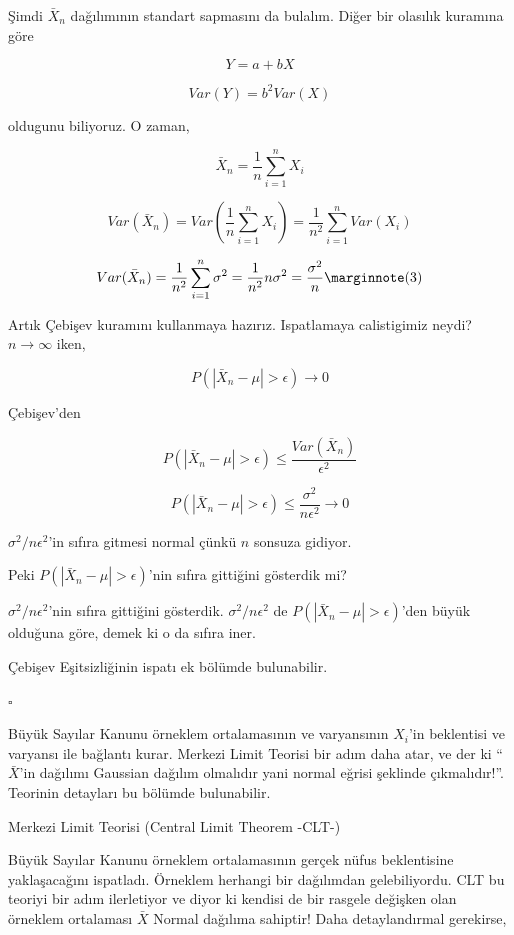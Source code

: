 \documentclass[12pt,fleqn]{article}\usepackage{../../common}
\begin{document}
Şimdi $\bar{X}_n$ dağılımının standart sapmasını da bulalım. Diğer bir
olasılık kuramına göre

$$ Y = a + bX $$

$$ Var(Y) = b^2Var(X) $$

oldugunu biliyoruz. O zaman,

$$ \bar{X}_n = \frac{1}{n} \sum_{i=1}^n X_i  $$

$$ Var(\bar{X}_n) = Var(\frac{1}{n}\sum_{i=1}^nX_i) = 
\frac{1}{n^2}\sum_{i=1}^n Var(X_i)
$$

$$ 
Var(\bar{X}_n) = \frac{1}{n^2}\sum_{i=1}^n \sigma^2 = 
\frac{1}{n^2}n\sigma^2 = \frac{\sigma^2}{n} 
\mlabel{3}
$$

Artık Çebişev kuramını kullanmaya hazırız. Ispatlamaya calistigimiz neydi?
$n \rightarrow \infty$ iken,

 $$ P(|\bar{X}_n-\mu| > \epsilon) \rightarrow 0 $$

Çebişev'den

$$ P(|\bar{X}_n-\mu| > \epsilon) \le \frac{Var(\bar{X}_n)}{\epsilon^2} $$

$$ P(|\bar{X}_n-\mu| > \epsilon) \le \frac{\sigma^2}{n\epsilon^2}
\rightarrow 0 $$

$\sigma^2 / n\epsilon^2$'in sıfıra gitmesi normal çünkü $n$ sonsuza gidiyor.

Peki $P(|\bar{X}_n-\mu| > \epsilon)$'nin sıfıra gittiğini gösterdik mi? 

$\sigma^2 / n\epsilon^2$'nin sıfıra gittiğini gösterdik. $\sigma^2 /
n\epsilon^2$ de $P(|\bar{X}_n-\mu| > \epsilon)$'den büyük olduğuna göre, demek
ki o da sıfıra iner.

Çebişev Eşitsizliğinin ispatı ek bölümde bulunabilir.

$\square$

Büyük Sayılar Kanunu örneklem ortalamasının ve varyansının $X_i$'in
beklentisi ve varyansı ile bağlantı kurar. Merkezi Limit Teorisi bir adım
daha atar, ve der ki ``$\bar{X}$'in dağılımı Gaussian dağılım olmalıdır
yani normal eğrisi şeklinde çıkmalıdır!''. Teorinin detayları bu bölümde
bulunabilir. 

Merkezi Limit Teorisi (Central Limit Theorem -CLT-)

Büyük Sayılar Kanunu örneklem ortalamasının gerçek nüfus beklentisine
yaklaşacağını ispatladı. Örneklem herhangi bir dağılımdan
gelebiliyordu. CLT bu teoriyi bir adım ilerletiyor ve diyor ki kendisi de
bir rasgele değişken olan örneklem ortalaması $\bar{X}$ Normal dağılıma
sahiptir! Daha detaylandırmal gerekirse, 
\end{document}
